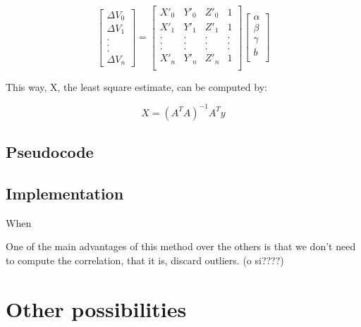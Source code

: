\begin{equation} \label{eq:matrixSystem}
\begin{bmatrix}
\Delta V_{0} \\ 
\Delta V_{1} \\
. \\
. \\
. \\
\Delta V_{n}
\end{bmatrix}
=
\begin{bmatrix}
X'_{0} & Y'_{0} & Z'_{0} & 1 \\ 
X'_{1} & Y'_{1} & Z'_{1} & 1 \\
. & . & . & .\\
. & . & . & .\\
. & . & . & .\\
X'_{n} & Y'_{n} & Z'_{n} & 1 \\
\end{bmatrix}
\begin{bmatrix}
\alpha \\ 
\beta \\
\gamma \\
b \\
\end{bmatrix}
\end{equation}

This way, X, the least square estimate, can be computed by:

\begin{equation}
	X = (A^{T}A)^{-1}A^{T}y
\end{equation}

\subsection{Pseudocode}

\subsection{Implementation}

When 

One of the main advantages of this method over the others is that we don't need to compute the correlation, that it is, discard outliers. (o si????)

\clearpage

\section{Other possibilities}

